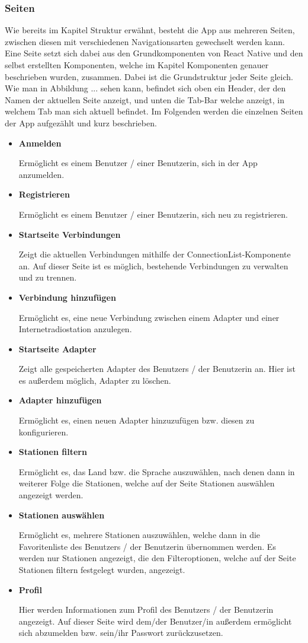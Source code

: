 \documentclass[11pt, twoside]{article}
\begin{document}
\subsubsection{Seiten}
Wie bereits im Kapitel Struktur erwähnt, besteht die App aus mehreren Seiten, zwischen diesen mit verschiedenen Navigationsarten gewechselt werden kann. Eine Seite setzt sich dabei aus den Grundkomponenten von React Native und den selbst erstellten Komponenten, welche im Kapitel Komponenten genauer beschrieben wurden, zusammen. Dabei ist die Grundstruktur jeder Seite gleich. Wie man in Abbildung ... sehen kann, befindet sich oben ein Header, der den Namen der aktuellen Seite anzeigt, und unten die Tab-Bar welche anzeigt, in welchem Tab man sich aktuell befindet.
Im Folgenden werden die einzelnen Seiten der App aufgezählt und kurz beschrieben.
\begin{itemize}
	\item \textbf{Anmelden} 
	\par Ermöglicht es einem Benutzer / einer Benutzerin, sich in der App anzumelden.
	\item \textbf{Registrieren} 
	\par Ermöglicht es einem Benutzer / einer Benutzerin, sich neu zu registrieren.
	\item \textbf{Startseite Verbindungen} 
	\par Zeigt die aktuellen Verbindungen mithilfe der ConnectionList-Komponente an. Auf dieser Seite ist es möglich, bestehende Verbindungen zu verwalten und zu trennen.
	\item \textbf{Verbindung hinzufügen}
	\par Ermöglicht es, eine neue Verbindung zwischen einem Adapter und einer Internetradiostation anzulegen.
	\item \textbf{Startseite Adapter}
	\par Zeigt alle gespeicherten Adapter des Benutzers / der Benutzerin an. Hier ist es außerdem möglich, Adapter zu löschen.
	\item \textbf{Adapter hinzufügen}
	\par Ermöglicht es, einen neuen Adapter hinzuzufügen bzw. diesen zu konfigurieren.
	\item \textbf{Stationen filtern}
	\par Ermöglicht es, das Land bzw. die Sprache auszuwählen, nach denen dann in weiterer Folge die Stationen, welche auf der Seite \glqq Stationen auswählen\grqq{} angezeigt werden.
	\item \textbf{Stationen auswählen}
	\par Ermöglicht es, mehrere Stationen auszuwählen, welche dann in die Favoritenliste des Benutzers / der Benutzerin übernommen werden. Es werden nur Stationen angezeigt, die den Filteroptionen, welche auf der Seite \glqq Stationen filtern\grqq{} festgelegt wurden, angezeigt.
	\item \textbf{Profil}
	\par Hier werden Informationen zum Profil des Benutzers / der Benutzerin angezeigt. Auf dieser Seite wird dem/der Benutzer/in außerdem ermöglicht sich abzumelden bzw. sein/ihr Passwort zurückzusetzen.
\end{itemize}
\end{document}
